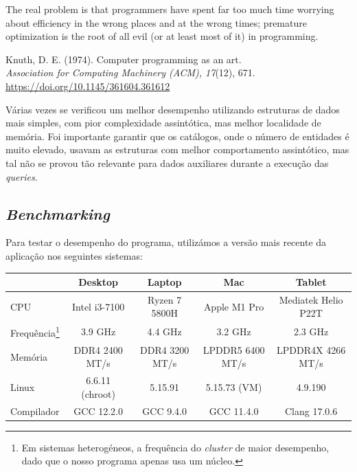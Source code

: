 \documentclass[11pt, a4paper]{article}
\begin{document}
\hspace{1cm}\parbox{15cm}{\small
    The real problem is that programmers have spent far too much time worrying about efficiency in
    the wrong places and at the wrong times; premature optimization is the root of all evil (or at
    least most of it) in programming.

    \begin{flushright}
        Knuth, D. E. (1974). Computer programming as an art. \\
        \emph{Association for Computing Machinery (ACM), 17}(12), 671. \\
        \url{https://doi.org/10.1145/361604.361612}
    \end{flushright}
}

Várias vezes se verificou um melhor desempenho utilizando estruturas de dados mais simples, com pior
complexidade assintótica, mas melhor localidade de memória. Foi importante garantir que os
catálogos, onde o número de entidades é muito elevado, usavam as estruturas com melhor comportamento
assintótico, mas tal não se provou tão relevante para dados auxiliares durante a execução das
\emph{queries}.

\subsection{\emph{Benchmarking}}
\label{sec:benchmarking}

Para testar o desempenho do programa, utilizámos a versão mais recente da aplicação nos seguintes
sistemas:

\begin{adjustwidth}{-1.5cm}{-1.5cm}
    \begin{center}
        \begin{tabular}{|l|c|c|c|c|}
            \hline
            & Desktop & Laptop & Mac & Tablet \\
            \hline
            CPU & Intel i3-7100 & Ryzen 7 5800H & Apple M1 Pro & Mediatek Helio P22T \\
            \hline
            Frequência\footnote{Em sistemas heterogéneos, a frequência do \emph{cluster} de maior
                                desempenho, dado que o nosso programa apenas usa um núcleo.} &
            3.9 GHz & 4.4 GHz & 3.2 GHz & 2.3 GHz \\
            \hline
            Memória & DDR4 2400 MT/s & DDR4 3200 MT/s & LPDDR5 6400 MT/s & LPDDR4X 4266 MT/s \\
            \hline
            Linux & 6.6.11 (chroot) & 5.15.91 & 5.15.73 (VM) & 4.9.190 \\
            \hline
            Compilador & GCC 12.2.0 & GCC 9.4.0 & GCC 11.4.0 & Clang 17.0.6 \\
            \hline
        \end{tabular}
    \end{center}
\end{adjustwidth}
\end{document}
